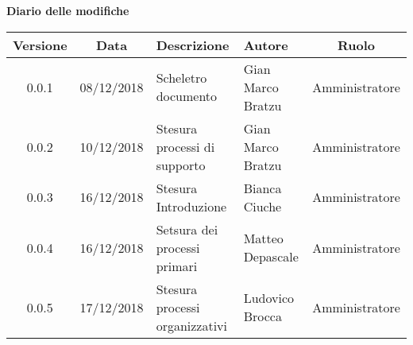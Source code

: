 	\begin{center}
		\textbf{Diario delle modifiche}
	\end{center}
	\begin{center}
		\begin{tabularx}{\textwidth}{|c|c|X|X|c|}
			\hline
			\textbf{Versione} & \textbf{Data} & \textbf{Descrizione} & \textbf{Autore} & \textbf{Ruolo} \\
			\hline
			0.0.1 & 08/12/2018 & Scheletro documento  & Gian Marco Bratzu & Amministratore\\
			0.0.2 & 10/12/2018 & Stesura processi di supporto & Gian Marco Bratzu & Amministratore\\	
			0.0.3 & 16/12/2018 & Stesura Introduzione & Bianca Ciuche & Amministratore\\
			0.0.4 & 16/12/2018 & Setsura dei processi primari & Matteo Depascale & Amministratore\\
			0.0.5 & 17/12/2018 & Stesura processi organizzativi & Ludovico Brocca & Amministratore\\
			\hline
		\end{tabularx}
	\end{center}

\newpage